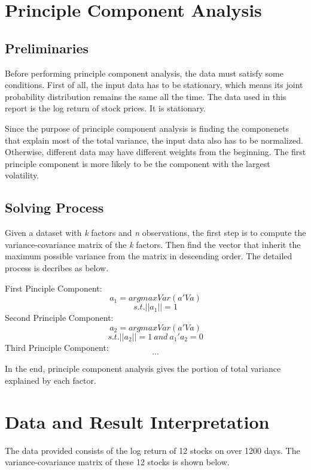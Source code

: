 \documentclass[conference]{IEEEtran}
\begin{document}
\section{Principle Component Analysis}
\subsection{Preliminaries}
Before performing principle component analysis, the data must satisfy some conditions. First of all, the input data has to be stationary, which means its joint probability distribution remains the same all the time. The data used in this report is the log return of stock prices. It is stationary. 

Since the purpose of principle component analysis is finding the componenets that explain most of the total variance, the input data also has to be normalized. Otherwise, different data may have different weights from the beginning. The 
first principle component is more likely to be the component with the largest volatility. 

\subsection{Solving Process}
Given a dataset with \emph{k} factors and \emph{n} observations, the first step is to compute the variance-covariance matrix of the \emph{k} factors. Then find the vector that inherit the maximum possible variance from the matrix in descending order. The detailed process is decribes as below. 

First Pinciple Component:
$$a_1 = argmaxVar(a'Va) $$
$$s.t. ||a_1|| = 1$$
Second Principle Component:
$$a_2 = argmaxVar(a'Va) $$
$$s.t. ||a_2|| = 1 \ and\  a_1'a_2 = 0$$
Third Principle Component: 
$$...$$

In the end, principle component analysis gives the portion of total variance explained by each factor. 


\section{Data and Result Interpretation}
The data provided consists of the log return of 12 stocks on over 1200 days. The variance-covariance matrix of these 12 stocks is shown below. 
\end{document}

